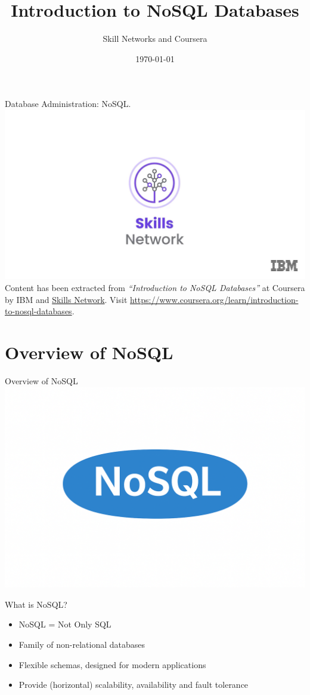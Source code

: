\documentclass[aspectratio=169]{beamer}
\title{Introduction to NoSQL Databases}
\author{Skill Networks and Coursera}
\date{\today}
\begin{document}
\frame{\titlepage}

\begin{frame}{Database Administration: NoSQL.}
    \centering
    \includegraphics[width=0.75\linewidth]{figures/skills_network} \\
    \vspace{2mm}
    {
        \scriptsize
        Content has been extracted from \textit{``Introduction to NoSQL Databases''} at Coursera by IBM and \href{https://skills.network/}{Skills Network}. Visit \url{https://www.coursera.org/learn/introduction-to-nosql-databases}.
    }
\end{frame}

\section{Overview of NoSQL}

\begin{frame}{\centering Overview of NoSQL}
    \centering
    \includegraphics[width=0.75\linewidth]{figures/nosql}
\end{frame}

\begin{frame}{What is NoSQL?}
\begin{itemize}
    \item NoSQL = Not Only SQL
    \item Family of non-relational databases
    \item Flexible schemas, designed for modern applications
    \item Provide (horizontal) scalability, availability and fault tolerance
\end{itemize}
\end{frame}
\end{document}
